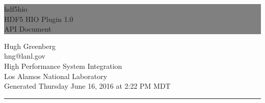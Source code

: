 \documentclass[twoside]{book}
\newcommand{\+}{}
\newcommand{\hdfhioversion}{HDF5 HIO Plugin 1.0}
\newcommand{\hdfhiodoctype}{API Document}
\newcommand{\generated}{Generated Thursday June 16, 2016 at  2:22 PM MDT}
\newcommand{\HRule}[1]{\hfill \rule{0.2\linewidth}{#1}} %
\begin{document}
\hypersetup{pageanchor=false,
             bookmarks=true,
             bookmarksnumbered=true,
            }
\begin{titlepage}

\colorbox{grey}{
	\parbox[t]{1.0\linewidth}{
		\centering \fontsize{50pt}{50pt}\selectfont 

		\vspace*{0.7cm} %
		
		\hfill hdf5hio \\
		\centering \fontsize{20pt}{50pt}\selectfont 
		\hfill \hdfhioversion{} \\
		\hfill \hdfhiodoctype{} \par
		
		\vspace*{0.7cm} %
	}
}


\vfill %


{\centering \large 
\hfill Hugh Greenberg\\
\hfill hng@lanl.gov\\
\vspace*{0.7cm}
\hfill High Performance System Integration\\
\hfill Los Alamos National Laboratory\\
\vspace*{0.7cm}
\hfill \generated{}\\

\HRule{1pt}} %


\clearpage %
\end{titlepage}
\clearemptydoublepage
\tableofcontents
\clearemptydoublepage
{}
\hypersetup{pageanchor=true}

\end{document}
